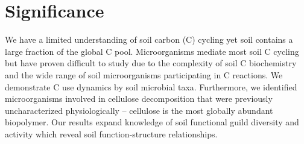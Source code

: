 \section{Significance} We have a limited understanding of soil carbon (C)
cycling yet soil contains a large fraction of the global C pool. Microorganisms
mediate most soil C cycling but have proven difficult to study due to the
complexity of soil C biochemistry and the wide range of soil microorganisms
participating in C reactions. We demonstrate C use dynamics by soil microbial
taxa. Furthermore, we identified microorganisms involved in cellulose
decomposition that were previously uncharacterized physiologically -- cellulose
is the most globally abundant biopolymer. Our results expand knowledge of soil
functional guild diversity and activity which reveal soil function-structure
relationships. 
